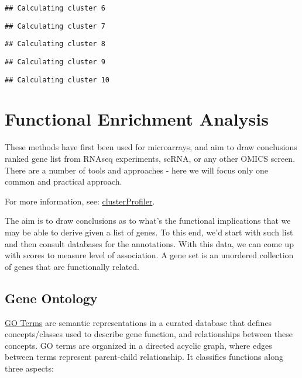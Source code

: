 \documentclass[
]{article}
\begin{document}
\begin{verbatim}
## Calculating cluster 6
\end{verbatim}

\begin{verbatim}
## Calculating cluster 7
\end{verbatim}

\begin{verbatim}
## Calculating cluster 8
\end{verbatim}

\begin{verbatim}
## Calculating cluster 9
\end{verbatim}

\begin{verbatim}
## Calculating cluster 10
\end{verbatim}

\hypertarget{functional-enrichment-analysis}{%
\section{Functional Enrichment
Analysis}\label{functional-enrichment-analysis}}

These methods have first been used for microarrays, and aim to draw
conclusions ranked gene list from RNAseq experiments, scRNA, or any
other OMICS screen. There are a number of tools and approaches - here we
will focus only one common and practical approach.

For more information, see:
\href{https://yulab-smu.top/biomedical-knowledge-mining-book/clusterProfiler-dplyr.html}{clusterProfiler}.

The aim is to draw conclusions as to what's the functional implications
that we may be able to derive given a list of genes. To this end, we'd
start with such list and then consult databases for the annotations.
With this data, we can come up with scores to measure level of
association. A gene set is an unordered collection of genes that are
functionally related.

\hypertarget{gene-ontology}{%
\subsection{Gene Ontology}\label{gene-ontology}}

\href{http://www.geneontology.org/}{GO Terms} are semantic
representations in a curated database that defines concepts/classes used
to describe gene function, and relationships between these concepts. GO
terms are organized in a directed acyclic graph, where edges between
terms represent parent-child relationship. It classifies functions along
three aspects:
\end{document}
